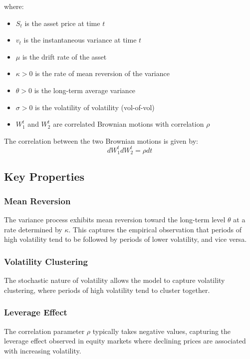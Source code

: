 \documentclass[12pt,a4paper]{article}
\begin{document}
where:
\begin{itemize}
    \item $S_t$ is the asset price at time $t$
    \item $v_t$ is the instantaneous variance at time $t$
    \item $\mu$ is the drift rate of the asset
    \item $\kappa > 0$ is the rate of mean reversion of the variance
    \item $\theta > 0$ is the long-term average variance
    \item $\sigma > 0$ is the volatility of volatility (vol-of-vol)
    \item $W_1^t$ and $W_2^t$ are correlated Brownian motions with correlation $\rho$
\end{itemize}

The correlation between the two Brownian motions is given by:
\begin{equation}
dW_1^t dW_2^t = \rho dt
\end{equation}

\subsection{Key Properties}

\subsubsection{Mean Reversion}
The variance process exhibits mean reversion toward the long-term level $\theta$ at a rate determined by $\kappa$. This captures the empirical observation that periods of high volatility tend to be followed by periods of lower volatility, and vice versa.

\subsubsection{Volatility Clustering}
The stochastic nature of volatility allows the model to capture volatility clustering, where periods of high volatility tend to cluster together.

\subsubsection{Leverage Effect}
The correlation parameter $\rho$ typically takes negative values, capturing the leverage effect observed in equity markets where declining prices are associated with increasing volatility.
\end{document}
